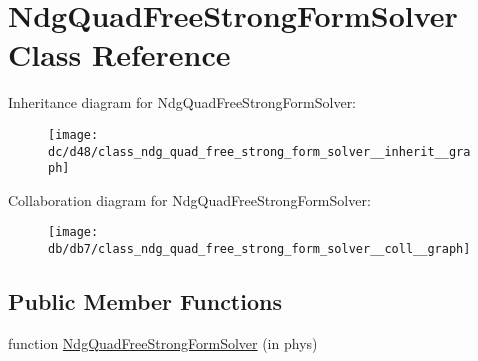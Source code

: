 \hypertarget{class_ndg_quad_free_strong_form_solver}{}\section{Ndg\+Quad\+Free\+Strong\+Form\+Solver Class Reference}
\label{class_ndg_quad_free_strong_form_solver}


Inheritance diagram for Ndg\+Quad\+Free\+Strong\+Form\+Solver\+:
\nopagebreak
\begin{figure}[H]
\begin{center}
\leavevmode
\texttt{[image: dc/d48/class\_ndg\_quad\_free\_strong\_form\_solver\_\_inherit\_\_graph]}
\end{center}
\end{figure}


Collaboration diagram for Ndg\+Quad\+Free\+Strong\+Form\+Solver\+:
\nopagebreak
\begin{figure}[H]
\begin{center}
\leavevmode
\texttt{[image: db/db7/class\_ndg\_quad\_free\_strong\_form\_solver\_\_coll\_\_graph]}
\end{center}
\end{figure}
\subsection*{Public Member Functions}
\begin{DoxyCompactItemize}
\item 
function \hyperlink{class_ndg_quad_free_strong_form_solver_ab1942d866c033da9a8f279917b4c5c11}{Ndg\+Quad\+Free\+Strong\+Form\+Solver} (in phys)
\end{DoxyCompactItemize}
